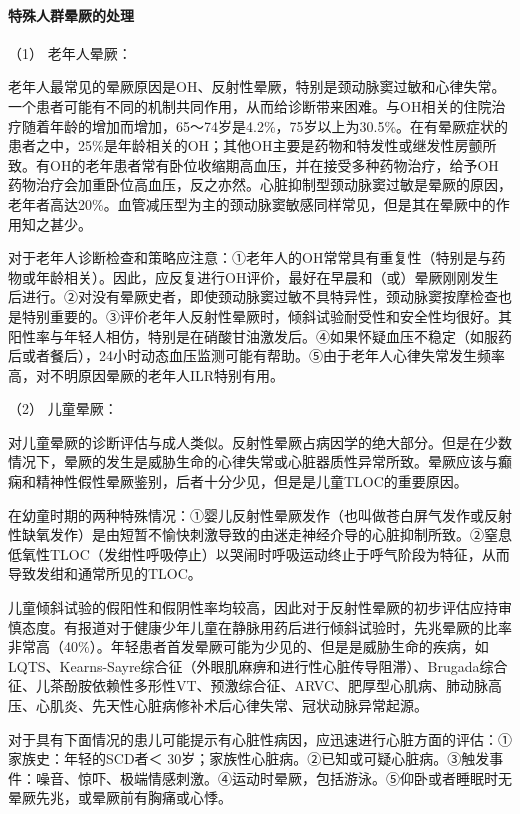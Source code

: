 \paragraph{特殊人群晕厥的处理}

\hypertarget{text00014.htmlux5cux23CHP1-4-4-1-5-1}{}
（1） 老年人晕厥：

老年人最常见的晕厥原因是OH、反射性晕厥，特别是颈动脉窦过敏和心律失常。一个患者可能有不同的机制共同作用，从而给诊断带来困难。与OH相关的住院治疗随着年龄的增加而增加，65～74岁是4.2\%，75岁以上为30.5\%。在有晕厥症状的患者之中，25\%是年龄相关的OH；其他OH主要是药物和特发性或继发性房颤所致。有OH的老年患者常有卧位收缩期高血压，并在接受多种药物治疗，给予OH药物治疗会加重卧位高血压，反之亦然。心脏抑制型颈动脉窦过敏是晕厥的原因，老年者高达20\%。血管减压型为主的颈动脉窦敏感同样常见，但是其在晕厥中的作用知之甚少。

对于老年人诊断检查和策略应注意：①老年人的OH常常具有重复性（特别是与药物或年龄相关）。因此，应反复进行OH评价，最好在早晨和（或）晕厥刚刚发生后进行。②对没有晕厥史者，即使颈动脉窦过敏不具特异性，颈动脉窦按摩检查也是特别重要的。③评价老年人反射性晕厥时，倾斜试验耐受性和安全性均很好。其阳性率与年轻人相仿，特别是在硝酸甘油激发后。④如果怀疑血压不稳定（如服药后或者餐后），24小时动态血压监测可能有帮助。⑤由于老年人心律失常发生频率高，对不明原因晕厥的老年人ILR特别有用。

\hypertarget{text00014.htmlux5cux23CHP1-4-4-1-5-2}{}
（2） 儿童晕厥：

对儿童晕厥的诊断评估与成人类似。反射性晕厥占病因学的绝大部分。但是在少数情况下，晕厥的发生是威胁生命的心律失常或心脏器质性异常所致。晕厥应该与癫痫和精神性假性晕厥鉴别，后者十分少见，但是是儿童TLOC的重要原因。

在幼童时期的两种特殊情况：①婴儿反射性晕厥发作（也叫做苍白屏气发作或反射性缺氧发作）是由短暂不愉快刺激导致的由迷走神经介导的心脏抑制所致。②窒息低氧性TLOC（发绀性呼吸停止）以哭闹时呼吸运动终止于呼气阶段为特征，从而导致发绀和通常所见的TLOC。

儿童倾斜试验的假阳性和假阴性率均较高，因此对于反射性晕厥的初步评估应持审慎态度。有报道对于健康少年儿童在静脉用药后进行倾斜试验时，先兆晕厥的比率非常高（40\%）。年轻患者首发晕厥可能为少见的、但是是威胁生命的疾病，如LQTS、Kearns-Sayre综合征（外眼肌麻痹和进行性心脏传导阻滞）、Brugada综合征、儿茶酚胺依赖性多形性VT、预激综合征、ARVC、肥厚型心肌病、肺动脉高压、心肌炎、先天性心脏病修补术后心律失常、冠状动脉异常起源。

对于具有下面情况的患儿可能提示有心脏性病因，应迅速进行心脏方面的评估：①家族史：年轻的SCD者＜
30岁；家族性心脏病。②已知或可疑心脏病。③触发事件：噪音、惊吓、极端情感刺激。④运动时晕厥，包括游泳。⑤仰卧或者睡眠时无晕厥先兆，或晕厥前有胸痛或心悸。

